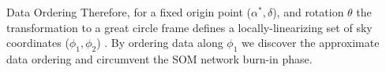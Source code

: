 \documentclass[final]{beamer}
\newlength{\colwidth}
\begin{document}
\begin{frame}[t]
\begin{columns}[t]
\begin{column}{\colwidth}
\begin{block}{Data Ordering}
            Therefore, for a fixed origin point ($\alpha^*, \delta$), and rotation $\theta$ the transformation
            to a great circle frame
            defines a locally-linearizing set of sky coordinates ($\phi_1, \phi_2$) \cite{jobovy/stellarkinematics}. By ordering data along $\phi_1$ we discover the approximate data ordering and circumvent the SOM network burn-in phase.
    

\end{block}
\end{column}
\end{columns}
\end{frame}
\end{document}
